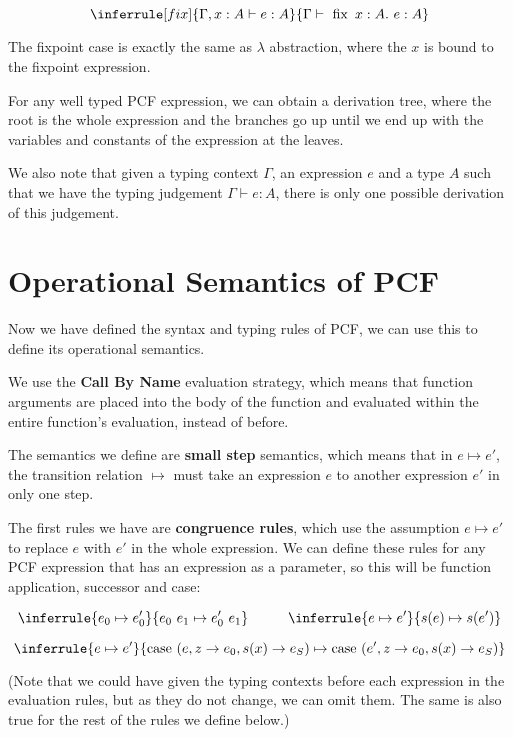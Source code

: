 $$
\inferrule [fix]{\Gamma, x : A \vdash e : A }
  {\Gamma \vdash \  \fix \ x:A . \ e : A}
$$

The fixpoint case is exactly the same as $\lambda$ abstraction, where the $x$ is bound to the fixpoint expression.

\vspace{0.5cm}

For any well typed PCF expression, we can obtain a derivation tree, where the root is the whole expression and the branches go up until we end up with the variables and constants of the expression at the leaves.

We also note that given a typing context $\Gamma$, an expression $e$ and a type $A$ such that we have the typing judgement $\Gamma \vdash e : A$, there is only one possible derivation of this judgement.

\chapter{Operational Semantics of PCF}\label{ch4}
Now we have defined the syntax and typing rules of PCF, we can use this to define its operational semantics.

We use the \textbf{Call By Name} evaluation strategy, which means that function arguments are placed into the body of the function and evaluated within the entire function's evaluation, instead of before.

The semantics we define are \textbf{small step} semantics, which means that in $e \mapsto e'$, the transition relation $\mapsto$ must take an expression $e$ to another expression $e'$ in only one step.

The first rules we have are \textbf{congruence rules}, which use the assumption $e \mapsto e'$ to replace $e$ with $e'$ in the whole expression. We can define these rules for any PCF expression that has an expression as a parameter, so this will be function application, successor and case:

$$
\inferrule { e_0 \mapsto e_0'} {e_0 \ e_1 \mapsto e_0' \ e_1}
\hspace{1cm}
\inferrule { e \mapsto e'} {s(e) \mapsto s(e')}
$$

$$
\inferrule { e \mapsto e'} {\case \ (e, z \to e_0 , s(x) \to e_S) \mapsto \case \ (e', z \to e_0 , s(x) \to e_S)}
$$

(Note that we could have given the typing contexts before each expression in the evaluation rules, but as they do not change, we can omit them. The same is also true for the rest of the rules we define below.) 

